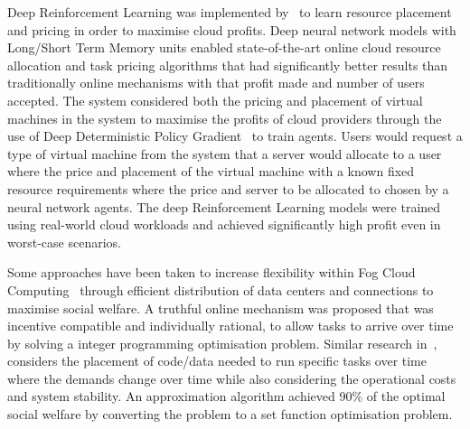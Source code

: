 Deep Reinforcement Learning was implemented by~\cite{Du2019} to learn resource placement and pricing in order to
maximise cloud profits. Deep neural network models with Long/Short Term Memory units enabled state-of-the-art online
cloud resource allocation and task pricing algorithms that had significantly better results than traditionally
online mechanisms with that profit made and number of users accepted. The system considered both the pricing and
placement of virtual machines in the system to maximise the profits of cloud providers through the use of Deep
Deterministic Policy Gradient~\citep{ddpg} to train agents. Users would request a type of virtual machine from the
system that a server would allocate to a user where the price and placement of the virtual machine with a known fixed
resource requirements where the price and server to be allocated to chosen by a neural network agents. The deep
Reinforcement Learning models were trained using real-world cloud workloads and achieved significantly high profit even
in worst-case scenarios.

Some approaches have been taken to increase flexibility within Fog Cloud Computing~\citep{Bi2019} through efficient
distribution of data centers and connections to maximise social welfare. A truthful online mechanism was
proposed that was incentive compatible and individually rational, to allow tasks to arrive over time by solving a
integer programming optimisation problem. Similar research in~\cite{vaji_infocom}, considers the placement of code/data
needed to run specific tasks over time where the demands change over time while also considering the operational costs
and system stability. An approximation algorithm achieved 90\% of the optimal social welfare by converting the problem
to a set function optimisation problem.

